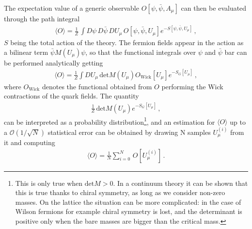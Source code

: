 %
The expectation value of a generic observable $O\left[\psi,\bar{\psi},A_{\mu}\right]$ can then be evaluated
through the path integral
\begin{align} 
    \label{eq:lattice_path_integral}
    \langle O\rangle = \frac{1}{Z}\,\int D\psi\, D\bar{\psi}\,DU_{\mu}\,
    O\left[\psi,\bar{\psi},U_{\mu}\right]e^{-S[\psi,\bar{\psi},U_{\mu}]}\,,
\end{align}
$S$ being the total action of the theory.
The fermion fields appear in the action as a bilinear term $\bar{\psi} M\left(U_{\mu}\right) \psi$,
so that the functional integrals over $\psi$ and $\bar{\psi}$ bar can be performed analytically getting
\begin{align}
    \label{eq:integrated_path_integral}
    \langle O\rangle = \frac{1}{Z}\int DU_{\mu}\,\text{det}M\left(U_{\mu}\right)
    O_{\text{Wick}}\left[U_{\mu}\right]e^{-S_G[U_{\mu}]}\,,
\end{align}
where $O_{\text{Wick}}$ denotes the functional obtained from $O$ performing the Wick contractions 
of the quark fields.
The quantity
\begin{align}
    \label{eq:prob_distribution}
    \frac{1}{Z}\,\text{det}M\left(U_{\mu}\right)e^{-S_G[U_{\mu}]}\,,
\end{align}
can be interpreted as a probability distribution\footnote{This is only true when $\text{det}M >0$. In a continuum theory it 
can be shown that this is true thanks to chiral symmetry, as long as we consider non-zero masses.
On the lattice the situation can be more complicated: in the case of Wilson fermions for example chiral symmetry is lost,
and the determinant is positive only when the bare masses are bigger than the critical mass.}, and an estimation
for $\langle O \rangle$ up to a $\mathcal{O}\left(1/\sqrt{N}\right)$ statistical error can be obtained by drawing
N samples $U_{\mu}^{(i)}$ from it and computing
\begin{align}
    \label{eq:average_O_lattice}
    \langle O \rangle = \frac{1}{N}\sum_{i=0}^N \, O\left[U_{\mu}^{(i)}\right]\,.
\end{align} 

